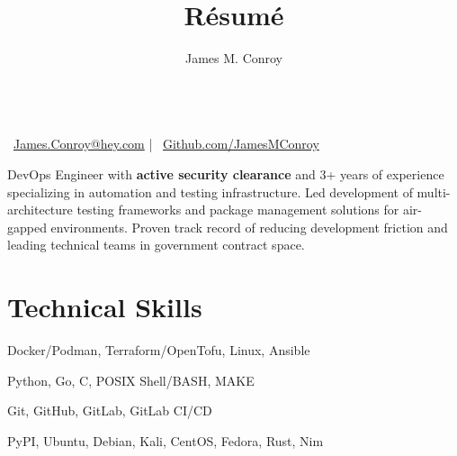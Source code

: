 \documentclass[11pt, a4paper]{article}
\author{James M. Conroy}
\title{R\'esum\'e}
\makeatletter
\newenvironment{summary}{%
  \begin{adjustwidth}{0em}{0em}
    \setlength{\parindent}{0pt}
    \setlength{\parskip}{0.5em}
}{%
  \end{adjustwidth}
}
\renewcommand{\maketitle} {
	\begin{center}
		{\Large\bfseries \theauthor} \\[0.3em]
	\faEnvelope \, \href{mailto:james.conroy@hey.com}{James.Conroy@hey.com}
	\hspace{0.5em} | \hspace{0.5em} 
	\faGithub \, \href{https://github.com/JamesMConroy}{Github.com/JamesMConroy}
	\end{center}
}
\makeatother
\begin{document}
\maketitle

\begin{summary}
\noindent
DevOps Engineer with \textbf{active security clearance} and 3+ years of experience specializing in automation and testing infrastructure. Led development of multi-architecture testing frameworks and package management solutions for air-gapped environments. Proven track record of reducing development friction and leading technical teams in government contract space.
\end{summary}

\section{Technical Skills}
\begin{description}[
    style=sameline,
    leftmargin=\widthof{\bfseries Programming Languages:}+1em\relax,
    labelwidth=\widthof{\bfseries Programming Languages:},
    labelindent=0pt,
    itemsep=0.3em
]
    \item[Infrastructure \& Cloud:] Docker/Podman, Terraform/OpenTofu, Linux, Ansible
    \item[Programming Languages:] Python, Go, C, POSIX Shell/BASH, MAKE
    \item[DevOps \& CI/CD:] Git, GitHub, GitLab, GitLab CI/CD
    \item[Package Management:] PyPI, Ubuntu, Debian, Kali, CentOS, Fedora, Rust, Nim
\end{description}
\newcommand{\jobsection}[2]{
    \subsection*{#1 \hfill #2}
}

\newcommand{\role}[2]{
    \textbf{#1} \hfill \textit{#2}
}
\end{document}
